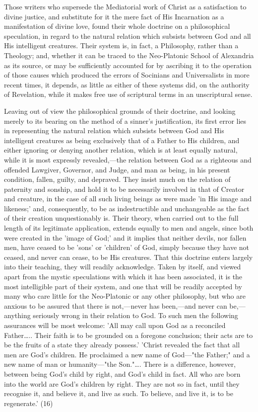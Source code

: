 \documentclass[
]{book}
\begin{document}
Those writers who supersede the Mediatorial work of Christ as a satisfaction to divine justice, and substitute for it the mere fact of His Incarnation as a manifestation of divine love, found their whole doctrine on a philosophical speculation, in regard to the natural relation which subsists between God and all His intelligent creatures. Their system is, in fact, a Philosophy, rather than a Theology; and, whether it can be traced to the Neo-Platonic School of Alexandria as its source, or may be sufficiently accounted for by ascribing it to the operation of those causes which produced the errors of Socinians and Universalists in more recent times, it depends, as little as either of these systems did, on the authority of Revelation, while it makes free use of scriptural terms in an unscriptural sense.

Leaving out of view the philosophical grounds of their doctrine, and looking merely to its bearing on the method of a sinner's justification, its first error lies in representing the natural relation which subsists between God and His intelligent creatures as being exclusively that of a Father to His children, and either ignoring or denying another relation, which is at least equally natural, while it is most expressly revealed,---the relation between God as a righteous and offended Lawgiver, Governor, and Judge, and man as being, in his present condition, fallen, guilty, and depraved. They insist much on the relation of paternity and sonship, and hold it to be necessarily involved in that of Creator and creature, in the case of all such living beings as were made 'in His image and likeness;' and, consequently, to be as indestructible and unchangeable as the fact of their creation unquestionably is. Their theory, when carried out to the full length of its legitimate application, extends equally to men and angels, since both were created in the 'image of God;' and it implies that neither devils, nor fallen men, have ceased to be 'sons' or 'children' of God, simply because they have not ceased, and never can cease, to be His creatures. That this doctrine enters largely into their teaching, they will readily acknowledge. Taken by itself, and viewed apart from the mystic speculations with which it has been associated, it is the most intelligible part of their system, and one that will be readily accepted by many who care little for the Neo-Platonic or any other philosophy, but who are anxious to be assured that there is not,---never has been,---and never can be,---anything seriously wrong in their relation to God. To such men the following assurances will be most welcome: 'All may call upon God as a reconciled Father\ldots.. Their faith is to be grounded on a foregone conclusion; their acts are to be the fruits of a state they already possess.' 'Christ revealed the fact that all men are God's children. He proclaimed a new name of God---"the Father;" and a new name of man or humanity---"the Son."\ldots. There is a difference, however, between being God's child by right, and God's child in fact. All who are born into the world are God's children by right. They are not so in fact, until they recognise it, and believe it, and live as such. To believe, and live it, is to be regenerate.' (16)
\end{document}
